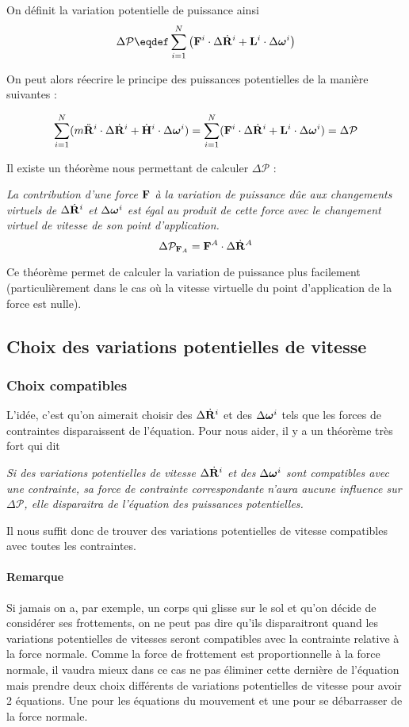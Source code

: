 On définit la variation potentielle de puissance ainsi
\[ \Delta \mathcal{P} \eqdef \sum_{i = 1}^N \left(\fv{F}^i \cdot \Delta \xgd^i + \st^i \cdot \Delta \omegaf^i\right) \]

On peut alors réecrire le principe des puissances potentielles de la manière suivantes :

$$\sum_{i=1}^N (m\ddot{\bf R}^i \cdot \Delta \dot{\bf R}^i + \dot{{\bf H}}^i \cdot \Delta {\bm \omega}^i) = 
\sum_{i=1}^N ({\bf F}^i \cdot \Delta \dot{\bf R}^i + {\bf L}^i \cdot \Delta {\bm \omega}^i) = \Delta \mathcal{P}$$

Il existe un théorème nous permettant de calculer $\Delta \mathcal{P}$ :

\begin{center}
  {\it
		La contribution d'une force ${\bf F}$ à la variation de puissance dûe aux changements
		virtuels de $\Delta \dot{\bf R}^i$ et $\Delta {\bm \omega}^i$ est égal au produit de cette force avec
		le changement virtuel de vitesse de son point d'application.	
		$$\Delta \mathcal{P}_{{\bf F}_A} = {\bf F}^A \cdot \Delta \dot{\bf R}^A$$
	}
\end{center}

Ce théorème permet de calculer la variation de puissance plus facilement (particulièrement dans le
cas où la vitesse virtuelle du point d'application de la force est nulle).

\subsection{Choix des variations potentielles de vitesse}
\subsubsection{Choix compatibles}
L'idée, c'est qu'on aimerait choisir des $\Delta \dot{\bf R}^i$ et des $\Delta {\bm \omega}^i$ tels que les forces de contraintes disparaissent de l'équation.
Pour nous aider, il y a un théorème très fort qui dit
\begin{center}
  {\it
    Si des variations potentielles de vitesse $\Delta \dot{\bf R}^i$ et des
    $\Delta {\bm \omega}^i$ sont compatibles avec une contrainte,
    sa force de contrainte correspondante n'aura aucune influence
    sur $\Delta \mathcal{P}$,
    elle disparaitra de l'équation des puissances potentielles.
  }
\end{center}

Il nous suffit donc de trouver des variations potentielles de vitesse compatibles avec toutes les contraintes.

\paragraph{Remarque}
Si jamais on a, par exemple, un corps qui glisse sur le sol et qu'on décide de considérer ses frottements,
on ne peut pas dire qu'ils disparaitront quand les variations potentielles de vitesses seront compatibles avec la contrainte relative à la force normale.
Comme la force de frottement est proportionnelle à la force normale, il vaudra mieux dans ce cas ne pas éliminer cette dernière de l'équation mais prendre deux choix différents de variations potentielles de vitesse pour avoir 2 équations.
Une pour les équations du mouvement et une pour se débarrasser de la force normale.


